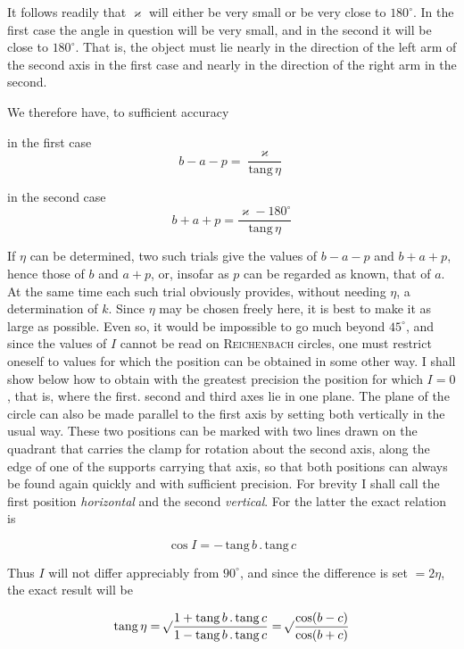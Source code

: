 \noindent It follows readily that $\varkappa$ will either be very small or be very close to $180^\circ$. In the first case the angle in question will be very small, and in the second it will be close to $180^\circ$. That is, the object must lie nearly in the direction of the left arm of the second axis in the first case and nearly in the direction of the right arm in the second.

\par\indent We therefore have, to sufficient accuracy

\noindent in the first case \[ b - a - p = \frac{\varkappa}{\mathrm{tang}\,\eta} \]

\noindent in the second case \[ b + a + p = \frac{\varkappa - 180^\circ}{\mathrm{tang}\,\eta} \]

\par\indent If $\eta$ can be determined, two such trials give the values of $b-a-p$ and $b+a+p$, hence those of $b$ and $a+p$, or, insofar as $p$ can be regarded as known, that of $a$. At the same time each such trial obviously provides, without needing $\eta$, a determination of $k$. Since $\eta$ may be chosen freely here, it is best to make it as large as possible. Even so, it would be impossible to go much beyond $45^\circ$, and since the values of $I$ cannot be read on \textsc{Reichenbach} circles, one must restrict oneself to values for which the position can be obtained in some other way. I shall show below how to obtain with the greatest precision the position for which $I=0$, that is, where the first. second and third axes lie in one plane. The plane of the circle can also be made parallel to the first axis by setting both vertically in the usual way. These two positions can be marked with two lines drawn on the quadrant that carries the clamp for rotation about the second axis, along the edge of one of the supports carrying that axis, so that both positions can always be found again quickly and with sufficient precision. For brevity I shall call the first position \emph{horizontal} and the second \emph{vertical}. For the latter the exact relation is

\[ \cos I = -\,\mathrm{tang}\,b\,.\,\mathrm{tang}\,c \]

\noindent Thus $I$ will not differ appreciably from $90^\circ$, and since the difference is set $=2\eta$, the exact result will be

\[ \mathrm{tang}\,\eta = \mathord{{}^{}\!\surd}\dfrac{1+\mathrm{tang}\,b\,.\,\mathrm{tang}\,c}{1-\mathrm{tang}\,b\,.\,\mathrm{tang}\,c} = \mathord{{}^{}\!\surd}\dfrac{\cos(b-c)}{\cos(b+c)} \]

